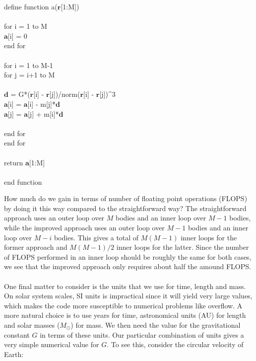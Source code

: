 \documentclass{article}
\newcommand{\mb}[1]{\mathbf{#1}}
\newenvironment{codefont}{\ttfamily}{\par}
\begin{document}
\begin{codefont}
define function a($\mb{r}$[1:M]) \\\\
\indent for i = 1 to M \\
\indent\indent $\mb{a}$[i] = 0 \\
\indent end for \\\\
\indent for i = 1 to M-1 \\
\indent\indent for j = i+1 to M \\\\
    \indent\indent\indent $\mb{d}$ = G*($\mb{r}$[i] - $\mb{r}$[j])/norm($\mb{r}$[i] - $\mb{r}$[j])\^{}3 \\
    \indent\indent\indent $\mb{a}$[i] = $\mb{a}$[i] - m[j]*$\mb{d}$ \\
    \indent\indent\indent $\mb{a}$[j] = $\mb{a}$[j] + m[i]*$\mb{d}$ \\\\
\indent\indent end for \\
\indent end for \\\\
\indent return $\mb{a}$[1:M] \\\\
end function \\
\end{codefont}
\noindent How much do we gain in terms of number of floating point operations (FLOPS) by doing it this way compared to the straightforward way? The straightforward approach uses an outer loop over $M$ bodies and an inner loop over $M-1$ bodies, while the improved approach uses an outer loop over $M-1$ bodies and an inner loop over $M-i$ bodies. This gives a total of $M(M-1)$ inner loops for the former approach and $M(M-1)/2$ inner loops for the latter. Since the number of FLOPS performed in an inner loop should be roughly the same for both cases, we see that the improved approach only requires about half the amound FLOPS. \\\\
One final matter to consider is the units that we use for time, length and mass. On solar system scales, SI units is impractical since it will yield very large values, which makes the code more susceptible to numerical problems like overflow. A more natural choice is to use years for time, astronomical units (AU) for length and solar masses ($M_\odot$) for mass. We then need the value for the gravitational constant $G$ in terms of these units. Our particular combination of units gives a very simple numerical value for $G$. To see this, consider the circular velocity of Earth:
\end{document}
